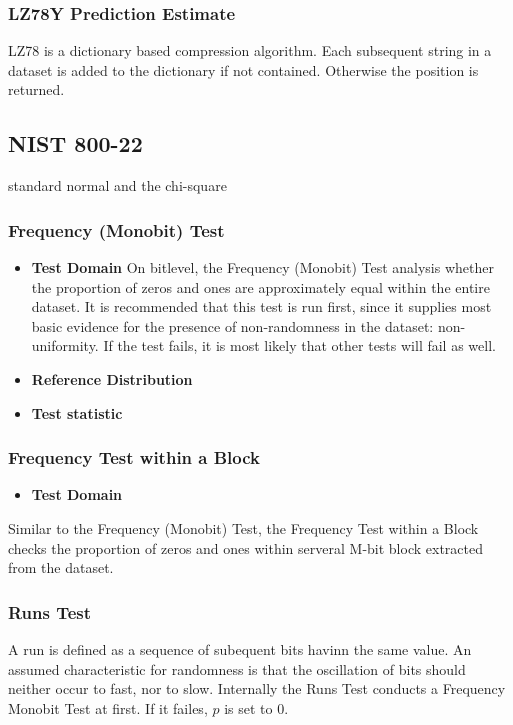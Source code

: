 \subsubsection{LZ78Y Prediction Estimate}\label{non-iid-est:lz78y}
LZ78 is a dictionary based compression algorithm. Each subsequent string in a dataset is added to the dictionary if not contained. Otherwise the position is returned. 


\subsection{NIST 800-22}

standard normal and the chi-square 
\subsubsection{Frequency (Monobit) Test}\label{ss:freq-monobit}
\begin{itemize}
	\item \textbf{Test Domain}
	On bitlevel, the Frequency (Monobit) Test analysis whether the proportion of zeros and ones are approximately equal within the entire dataset. It is recommended that this test is run first, since it supplies most basic evidence for the presence of non-randomness in the dataset: non-uniformity. If the test fails, it is most likely that other tests will fail as well. 
	\item \textbf{Reference Distribution}
	\item \textbf{Test statistic}	
\end{itemize}
\subsubsection{Frequency Test within a Block}
\begin{itemize}
	\item \textbf{Test Domain}
\end{itemize}


Similar to the Frequency (Monobit) Test, the Frequency Test within a Block checks the proportion of zeros and ones within serveral M-bit block extracted from the dataset. 
\subsubsection{Runs Test}
A run is defined as a sequence of subequent bits havinn the same value. An assumed characteristic for randomness is that the oscillation of bits should neither occur to fast, nor to slow. Internally the Runs Test conducts a Frequency Monobit Test at first. If it failes, $p$ is set to 0.
